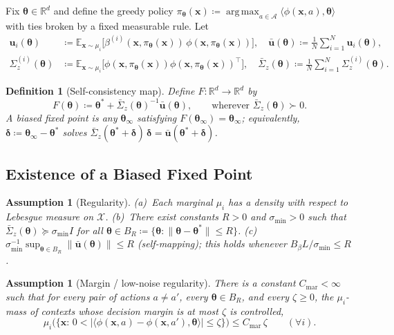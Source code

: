 \documentclass[11pt]{article}
\newtheorem{definition}[theorem]{Definition}
\newtheorem{assumption}[theorem]{Assumption}
\DeclareMathOperator*{\argmax}{arg\,max}
\begin{document}
Fix $\bm{\theta}\in\mathbb{R}^d$ and define the greedy policy
$\pi_{\bm{\theta}}(\bm{x})\coloneqq\argmax_{a\in\mathcal{A}}
\langle\phi(\bm{x},a),\bm{\theta}\rangle$
with ties broken by a fixed measurable rule.  Let
\begin{align}
\bm{u}_i(\bm{\theta})&\coloneqq
\mathbb{E}_{\bm{x}\sim\mu_i}\bigl[\beta^{(i)}(\bm{x},\pi_{\bm{\theta}}(\bm{x}))\,
\phi(\bm{x},\pi_{\bm{\theta}}(\bm{x}))\bigr],\quad
\bar{\bm{u}}(\bm{\theta})\coloneqq\tfrac{1}{N}\sum_{i=1}^N\bm{u}_i(\bm{\theta}),
\label{eq:u_policy}\\
\Sigma_z^{(i)}(\bm{\theta})&\coloneqq
\mathbb{E}_{\bm{x}\sim\mu_i}\bigl[\phi(\bm{x},\pi_{\bm{\theta}}(\bm{x}))
\phi(\bm{x},\pi_{\bm{\theta}}(\bm{x}))^\top\bigr],\quad
\bar{\Sigma}_z(\bm{\theta})\coloneqq\tfrac{1}{N}\sum_{i=1}^N\Sigma_z^{(i)}(\bm{\theta}).
\label{eq:Sigma_policy}
\end{align}

\begin{definition}[Self-consistency map]\label{def:F}
Define $F:\mathbb{R}^d\to\mathbb{R}^d$ by
\[
F(\bm{\theta})\coloneqq\bm{\theta}^{\!*}+\bar{\Sigma}_z(\bm{\theta})^{-1}\bar{\bm{u}}(\bm{\theta}),
\qquad\text{wherever }\bar{\Sigma}_z(\bm{\theta})\succ 0.
\]
A \emph{biased fixed point} is any $\bm{\theta}_\infty$ satisfying
$F(\bm{\theta}_\infty)=\bm{\theta}_\infty$; equivalently,
$\bm{\delta}\coloneqq\bm{\theta}_\infty-\bm{\theta}^{\!*}$ solves
$\bar{\Sigma}_z(\bm{\theta}^{\!*}+\bm{\delta})\,\bm{\delta}
=\bar{\bm{u}}(\bm{\theta}^{\!*}+\bm{\delta})$.
\end{definition}

\subsection{Existence of a Biased Fixed Point}

\begin{assumption}[Regularity]\label{ass:reg}
(a)~Each marginal $\mu_i$ has a density with respect to Lebesgue
measure on $\mathcal{X}$.
(b)~There exist constants $R>0$ and $\sigma_{\min}>0$ such that
$\bar{\Sigma}_z(\bm{\theta})\succeq\sigma_{\min}I$ for all
$\bm{\theta}\in B_R\coloneqq\{\bm{\theta}:\|\bm{\theta}-\bm{\theta}^{\!*}\|\leq R\}$.
(c)~$\sigma_{\min}^{-1}\sup_{\bm{\theta}\in B_R}\|\bar{\bm{u}}(\bm{\theta})\|\leq R$
(self-mapping); this holds whenever $B_\beta L/\sigma_{\min}\leq R$.
\end{assumption}

\begin{assumption}[Margin / low-noise regularity]\label{ass:margin}
There is a constant $C_{\mathrm{mar}}<\infty$ such that for every pair
of actions $a\neq a'$, every $\bm{\theta}\in B_R$, and every $\zeta\geq 0$,
the $\mu_i$-mass of contexts whose decision margin is at most $\zeta$
is controlled,
\[
\mu_i\bigl(\{\bm{x}:\,
0<|\langle\phi(\bm{x},a)-\phi(\bm{x},a'),\bm{\theta}\rangle|\leq\zeta\}\bigr)
\leq C_{\mathrm{mar}}\,\zeta
\qquad(\forall i).
\]
\end{assumption}
\end{document}
